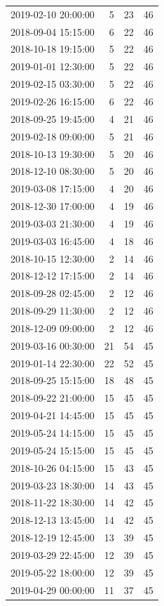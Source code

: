\begin{tabular}{lrrr}
2019-02-10 20:00:00 & 5 & 23 & 46 \\
2018-09-04 15:15:00 & 6 & 22 & 46 \\
2018-10-18 19:15:00 & 5 & 22 & 46 \\
2019-01-01 12:30:00 & 5 & 22 & 46 \\
2019-02-15 03:30:00 & 5 & 22 & 46 \\
2019-02-26 16:15:00 & 6 & 22 & 46 \\
2018-09-25 19:45:00 & 4 & 21 & 46 \\
2019-02-18 09:00:00 & 5 & 21 & 46 \\
2018-10-13 19:30:00 & 5 & 20 & 46 \\
2018-12-10 08:30:00 & 5 & 20 & 46 \\
2019-03-08 17:15:00 & 4 & 20 & 46 \\
2018-12-30 17:00:00 & 4 & 19 & 46 \\
2019-03-03 21:30:00 & 4 & 19 & 46 \\
2019-03-03 16:45:00 & 4 & 18 & 46 \\
2018-10-15 12:30:00 & 2 & 14 & 46 \\
2018-12-12 17:15:00 & 2 & 14 & 46 \\
2018-09-28 02:45:00 & 2 & 12 & 46 \\
2018-09-29 11:30:00 & 2 & 12 & 46 \\
2018-12-09 09:00:00 & 2 & 12 & 46 \\
2019-03-16 00:30:00 & 21 & 54 & 45 \\
2019-01-14 22:30:00 & 22 & 52 & 45 \\
2018-09-25 15:15:00 & 18 & 48 & 45 \\
2018-09-22 21:00:00 & 15 & 45 & 45 \\
2019-04-21 14:45:00 & 15 & 45 & 45 \\
2019-05-24 14:15:00 & 15 & 45 & 45 \\
2019-05-24 15:15:00 & 15 & 45 & 45 \\
2018-10-26 04:15:00 & 15 & 43 & 45 \\
2019-03-23 18:30:00 & 14 & 43 & 45 \\
2018-11-22 18:30:00 & 14 & 42 & 45 \\
2018-12-13 13:45:00 & 14 & 42 & 45 \\
2018-12-19 12:45:00 & 13 & 39 & 45 \\
2019-03-29 22:45:00 & 12 & 39 & 45 \\
2019-05-22 18:00:00 & 12 & 39 & 45 \\
2019-04-29 00:00:00 & 11 & 37 & 45 \\

\end{tabular}
